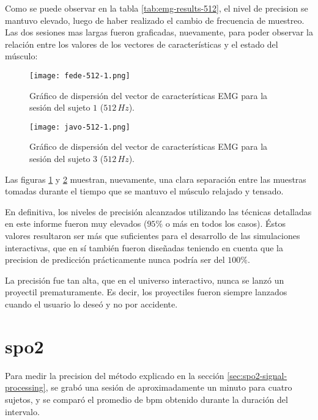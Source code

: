Como se puede observar en la tabla \ref{tab:emg-results-512}, el nivel de precision se mantuvo elevado, luego de haber realizado el cambio de frecuencia de muestreo. Las dos sesiones mas largas fueron graficadas, nuevamente, para poder observar la relación entre los valores de los vectores de características y el estado del músculo:

\begin{figure}[H]
	\centering
    \texttt{[image: fede-512-1.png]}
    \caption{Gráfico de dispersión del vector de características EMG para la sesión del sujeto $1$ ($512\,Hz$).}
	\label{fig:emg-graph-s1-512}
\end{figure}

\begin{figure}[H]
	\centering
    \texttt{[image: javo-512-1.png]}
    \caption{Gráfico de dispersión del vector de características EMG para la sesión del sujeto $3$ ($512\,Hz$).}
	\label{fig:emg-graph-s3-512}
\end{figure}

Las figuras \ref{fig:emg-graph-s1-512} y \ref{fig:emg-graph-s3-512} muestran, nuevamente, una clara separación entre las muestras tomadas durante el tiempo que se mantuvo el músculo relajado y tensado.

En definitiva, los niveles de precisión alcanzados utilizando las técnicas detalladas en este informe fueron muy elevados ($95\%$ o más en todos los casos). Éstos valores resultaron ser más que suficientes para el desarrollo de las simulaciones interactivas, que en sí también fueron diseñadas teniendo en cuenta que la precision de predicción prácticamente nunca podría ser del $100\%$.

La precisión fue tan alta, que en el universo interactivo, nunca se lanzó un proyectil prematuramente. Es decir, los proyectiles fueron siempre lanzados cuando el usuario lo deseó y no por accidente.

\section{\acrshort{spo2}}

Para medir la precision del método explicado en la sección \ref{sec:spo2-signal-processing}, se grabó una sesión de aproximadamente un minuto para cuatro sujetos, y se comparó el promedio de \acrshort{bpm} obtenido durante la duración del intervalo.


